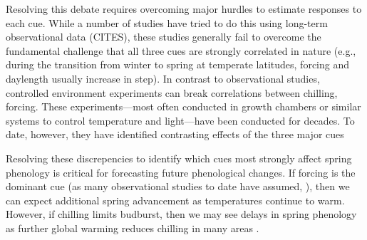 \documentclass{article}
\begin{document}
\par Resolving this debate requires overcoming major hurdles to estimate responses to each cue. While a number of studies have tried to do this using long-term observational data (CITES), these studies generally fail to overcome the fundamental challenge that all three cues are strongly correlated in nature (e.g., during the transition from winter to spring at temperate latitudes, forcing and daylength usually increase in step). In contrast to observational studies, controlled environment experiments can break correlations between chilling, forcing. These experiments---most often conducted in growth chambers or similar systems to control temperature and light---have been conducted for decades. To date, however, they have identified contrasting effects of the three major cues \citep{zohner2016,Laube:2014a,Basler:2012,Caffarra:2011b,Caffarra:2011a}

\par Resolving these discrepencies to identify which cues most strongly affect spring phenology is critical for forecasting future phenological changes. If forcing is the dominant cue (as many observational studies to date have assumed, \citep{bradley1999,menzel2006,harrington2015}), then we can expect additional spring advancement as temperatures continue to warm. However, if chilling limits budburst, then we may see delays in spring phenology as further global warming reduces chilling in many areas \citep{fraga2019}. 
\end{document}

